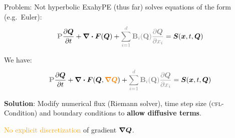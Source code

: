 \documentclass[aspectratio=169]{beamer}
\begin{document}



\begin{frame}{Problem: Not hyperbolic}
  ExahyPE (thus far) solves equations of the form (e.g.\ Euler):
  \begin{equation}
  \label{eq:conservation-law}
  \mathbf{\textcolor{gray}{P}}\pdv{\Q}{t} + \divergence{\flux(\Q)}
 +  \textcolor{gray}{\sum_{i=1}^d \mathbf{B}_i (\mathbf{Q}) \pdv{\Q}{x_i}}
  = \source(\bm{x}, t, \Q)
\end{equation}

We have:
\begin{equation}
  \label{eq:conservation-law-gradient}
  \mathbf{\textcolor{gray}{P}}\pdv{\Q}{t} + \divergence{\flux(\Q, \textcolor{orange}{\gradQ})}
 +  \textcolor{gray}{\sum_{i=1}^d \mathbf{B}_i (\mathbf{Q}) \pdv{\Q}{x_i}}
  = \source(\bm{x}, t, \Q)
\end{equation}

\textbf{Solution}:
Modify numerical flux (Riemann solver), time step size (\textsc{cfl}-Condition) and boundary conditions to \textbf{allow diffusive terms}.

\textcolor{orange}{No explicit discretization} of gradient $\gradQ$.
\end{frame}
\end{document}
